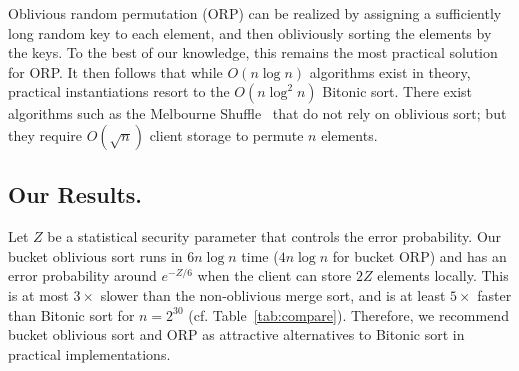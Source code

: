 Oblivious random permutation (ORP) can be realized by assigning a sufficiently long random key to each element, and then obliviously sorting the elements by the keys.
To the best of our knowledge, this remains the most practical solution for ORP.
It then follows that while $O(n \log n)$ algorithms exist in theory, practical instantiations resort to the $O(n \log^2 n)$ Bitonic sort.
There exist algorithms such as the Melbourne
Shuffle~\cite{ohrimenko2014melbourne} that do not rely on
oblivious sort; but they require $O(\sqrt{n})$ client storage to permute $n$ elements.

\subsection{Our Results.}
Let $Z$ be a statistical security parameter that controls the error probability. 
Our bucket oblivious sort runs in $6n\log n$ time ($4n\log n$ for bucket ORP) and has an error probability around $e^{-Z/6}$ when the client can store $2Z$ elements locally.
This is at most $3\times$ slower than the non-oblivious merge sort, and is at least $5\times$ faster than Bitonic sort for $n=2^{30}$ (cf. Table~\ref{tab:compare}).
Therefore, we recommend bucket oblivious sort and ORP as attractive alternatives to Bitonic sort in practical implementations.

